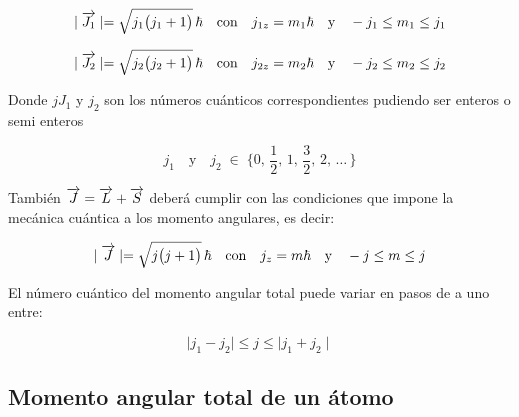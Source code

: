 \begin{equation}
	\mid\overrightarrow{J_{1}}\mid =\sqrt{j_{1}\big(j_{1}+1\big)}\,\hbar \quad \text{con} \quad j_{1z}= m_{1}\hbar \quad \text{y} \quad -j_{1} \leq m_{1} \leq j_{1}
\end{equation}

\begin{equation}
	\mid\overrightarrow{J_{2}}\mid =\sqrt{j_{2}\big(j_{2}+1\big)}\,\hbar \quad \text{con} \quad j_{2z}= m_{2}\hbar \quad \text{y} \quad -j_{2} \leq m_{2} \leq j_{2}
\end{equation}

%

Donde $jJ_{1}$ y $j_{2}$ son los números cuánticos correspondientes pudiendo ser enteros o semi enteros

\begin{equation}
	j_{1} \quad \text{y} \quad j_{2} \; \in \; \lbrace 0,\, \frac{1}{2},\, 1,\, \frac{3}{2},\, 2,\, \ldots\, \rbrace
\end{equation}

También $\overrightarrow{J}=\overrightarrow{L}+\overrightarrow{S}$ deberá cumplir con las condiciones que impone la mecánica cuántica a los momento angulares, es decir:

\begin{equation}
	\mid\overrightarrow{J}\mid =\sqrt{j\big(j+1\big)}\,\hbar \quad \text{con} \quad j_{z}= m\hbar \quad \text{y} \quad -j \leq m \leq j
\end{equation}

El número cuántico del momento angular total puede variar en pasos de a uno entre:

\begin{equation}
	\mid j_{1}-j_{2} \mid \leq j \leq \mid j_{1}+j_{2} \mid
\end{equation}

\subsection{Momento angular total de un átomo}

